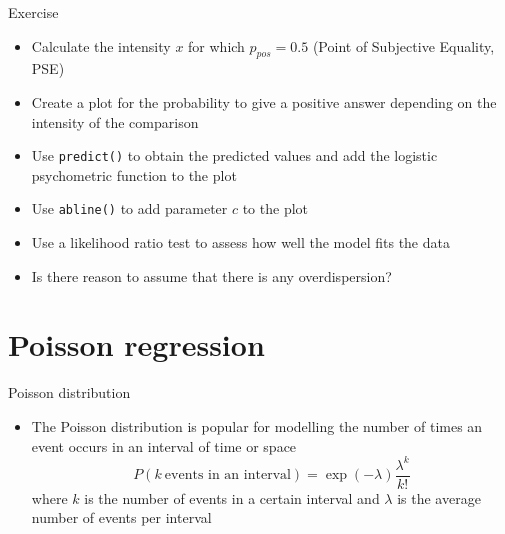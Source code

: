 \documentclass[aspectratio=169]{beamer}
\begin{document}
\begin{frame}[fragile]{}
  \begin{block}{Exercise}
    \begin{itemize}
      \item Calculate the intensity $x$ for which $p_{pos} = 0.5$ (Point of
        Subjective Equality, PSE)
      \item Create a plot for the probability to give a positive answer
        depending on the intensity of the comparison
      \item Use \texttt{predict()} to obtain the predicted values and add
        the logistic psychometric function to the plot
      \item Use \texttt{abline()} to add parameter $c$ to the plot
      \item Use a likelihood ratio test to assess how well the model fits the
        data
      \item Is there reason to assume that there is any overdispersion?
    \end{itemize}
  \end{block}
\end{frame}

\section{Poisson regression}

\begin{frame}{Poisson distribution}
\begin{itemize}
  \item The Poisson distribution is popular for modelling the number of
    times an event occurs in an interval of time or space
\[
  P(k~\text{events in an interval}) = \exp(-\lambda)\frac{\lambda^k}{k!}
\]
where $k$ is the number of events in a certain interval and $\lambda$ is
the average number of events per interval
\end{itemize}
\end{frame}
\end{document}
